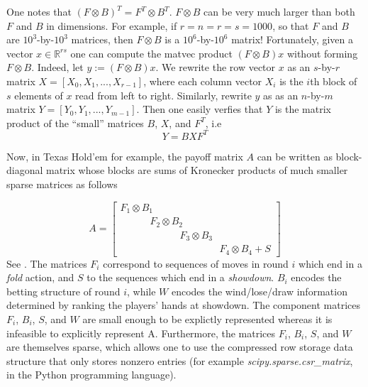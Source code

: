 \documentclass{article} %
\begin{document}
One notes that $(F \otimes B)^T = F^T \otimes B^T$.
$F \otimes B$ can be very much larger than both $F$ and $B$ in dimensions. For example, if $r = n = r = s = 1000$, so that $F$ and $B$ are $10^3$-by-$10^3$ matrices, then $F \otimes B$ is a $10^6$-by-$10^6$ matrix! Fortunately, given a vector $x \in \mathbb{R}^{rs}$ one can compute the matvec product $(F \otimes B)x$ without forming $F \otimes B$. Indeed, let $y := (F \otimes B)x$. We rewrite the row vector $x$ as an $s$-by-$r$ matrix $X = [X_0, X_1, ..., X_{r-1}]$, where each column vector $X_i$ is the $i$th block of $s$ elements of $x$ read from left to right. Similarly, rewrite $y$ as as an $n$-by-$m$ matrix $Y = [Y_0, Y_1, ..., Y_{m-1}]$. Then one easily verfies that $Y$ is the matrix product of the ``small'' matrices $B$, $X$, and $F^T$, i.e
\begin{equation}
  \label{eq:kron_matvec}
  Y = BXF^T
\end{equation}

Now, in Texas Hold'em for example, the payoff matrix $A$ can be written as block-diagonal matrix whose blocks are sums of Kronecker products of much smaller sparse matrices as follows

\begin{equation}
  A = \begin{bmatrix}F_1 \otimes B_1\hspace{10em}\\\hspace{3em}F_2 \otimes B_2\hspace{7em}\\\hspace{6em}F_3 \otimes B_3\hspace{4em}\\\hspace{10em}F_4 \otimes B_4 + S \end{bmatrix}
\label{eq:factor_A}
\end{equation}
See \cite{hoda2010smoothing}. The matrices $F_i$ correspond to sequences of moves in round $i$ which end in a \textit{fold} action, and $S$ to the sequences which end in a \textit{showdown}. $B_i$ encodes the betting structure of round $i$, while $W$ encodes the wind/lose/draw information determined by ranking the players' hands at showdown. The component matrices $F_i$, $B_i$, $S$, and $W$ are small enough to be explictly represented whereas it is infeasible to explicitly represent A. Furthermore, the matrices $F_i$, $B_i$,
$S$, and $W$ are themselves sparse, which allows one to use the compressed row storage data structure that only stores nonzero entries (for example \textit{scipy.sparse.csr\_matrix}, in the Python programming language).
\end{document}
